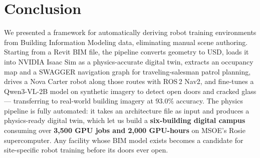 \documentclass[10pt,twocolumn,letterpaper]{article}
\begin{document}
\section{Conclusion}

We presented a framework for automatically deriving robot training environments
from Building Information Modeling data, eliminating manual scene authoring.
Starting from a Revit BIM file, the pipeline converts geometry to USD, loads it
into NVIDIA Isaac Sim as a physics-accurate digital twin, extracts an occupancy
map and a SWAGGER navigation graph for traveling-salesman patrol planning, drives
a Nova Carter robot along those routes with ROS\,2 Nav2, and fine-tunes a
Qwen3-VL-2B model on synthetic imagery to detect open doors and cracked glass ---
transferring to real-world building imagery at $93.0\%$ accuracy. The physics
pipeline is fully automated: it takes an architecture file as input and produces a
physics-ready digital twin, which let us build a \textbf{six-building digital
campus} consuming over \textbf{3{,}500 GPU jobs and 2{,}000 GPU-hours} on MSOE's
Rosie supercomputer. Any facility whose BIM model exists becomes a candidate for
site-specific robot training before its doors ever open.

{
    \small
    
    
}
\end{document}
